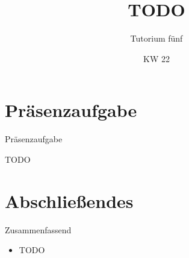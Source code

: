 \relax\relax

\iffull
\title{TODO}
\subtitle{Tutorium fünf}
\date{KW 22}

\fi
{}

\iffull
\titleframe

\fi

\fi

\section{Präsenzaufgabe}
\begin{frame}[fragile,c]{Präsenzaufgabe}
\begin{aufgabe}{TODO}
\end{aufgabe}
\end{frame}

\section{Abschließendes}
{\SummaryFrame
\begin{frame}[t]{Zusammenfassend}
\pause \printBibCommand
\vfill\vfill %
\begin{itemize}[<+(1)->]
    \itemsep6.5pt
    \item TODO
\end{itemize}
\end{frame}
}



\iffull\fi
